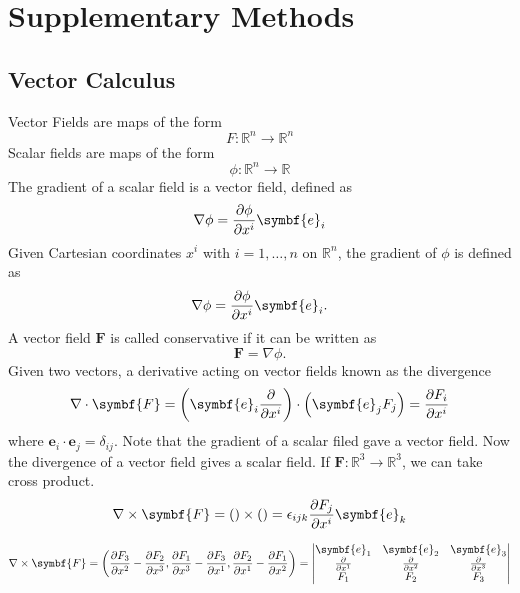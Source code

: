 \appendix




\chapter{Supplementary Methods}

\section{Vector Calculus}

Vector Fields are maps of the form
\begin{equation*}
	F\colon\mathbb{R}^{n}\to\mathbb{R}^{n}
\end{equation*}
Scalar fields are maps of the form
\begin{equation*}
	\phi\colon\mathbb{R}^{n}\to\mathbb{R}
\end{equation*}
The gradient of a scalar field is a vector field, defined as
\begin{equation*}
	\nabla\phi=
	\diffp{\phi}{x^{i}}\symbf{e}_{i}
\end{equation*}
Given Cartesian coordinates $x^{i}$ with $i=1,\dotsc,n$ on $\mathbb{R}^{n}$,
the gradient of $\phi$ is defined as
\begin{equation*}
	\nabla\phi=
	\diffp{\phi}{x^{i}}\symbf{e}_{i}.
\end{equation*}
A vector field $\symbf{F}$ is called conservative if it can be written as
\begin{equation*}
	\symbf{F}=\nabla\phi.
\end{equation*}
Given two vectors, a derivative acting on vector fields known as the divergence
\begin{equation*}
	\nabla\cdot\symbf{F}=
	\left(\symbf{e}_{i}\diffp{}{x^{i}}\right)\cdot
	\left(\symbf{e}_{j}F_{j}\right)=
	\diffp{F_{i}}{x^{i}}
\end{equation*}
where $\symbf{e}_{i}\cdot\symbf{e}_{j}=\delta_{ij}$.
Note that the gradient of a scalar filed gave a vector field.
Now the divergence of a vector field gives a scalar field.
If $\symbf{F}\colon\mathbb{R}^{3}\to\mathbb{R}^{3}$, we can take cross product.
\begin{equation*}
	\nabla\times\symbf{F}=
	\left(\right)\times\left(\right)=
	\epsilon_{ijk}\diffp{F_{j}}{x^{i}}\symbf{e}_{k}
\end{equation*}

\begin{equation*}
	\nabla\times\symbf{F}=
	\left(
	\diffp{F_{3}}{x^{2}}-\diffp{F_{2}}{x^{3}},
	\diffp{F_{1}}{x^{3}}-\diffp{F_{3}}{x^{1}},
	\diffp{F_{2}}{x^{1}}-\diffp{F_{1}}{x^{2}}
	\right)=
	\begin{vmatrix}
		\symbf{e}_{1}   & \symbf{e}_{2}   & \symbf{e}_{3}   \\
		\diffp{}{x^{1}} & \diffp{}{x^{2}} & \diffp{}{x^{3}} \\
		F_{1}           & F_{2}           & F_{3}
	\end{vmatrix}
\end{equation*}

